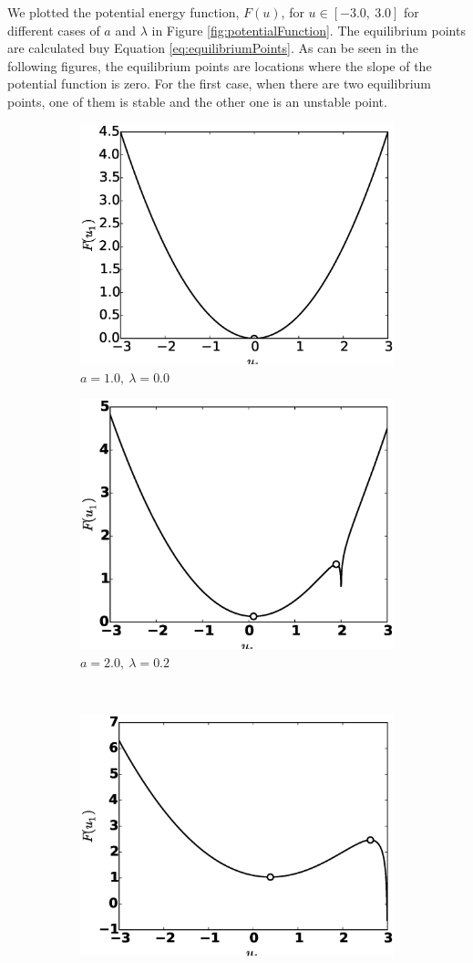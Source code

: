 \documentclass[12pt, a4paper]{extreport}
\begin{document}
%
We plotted the potential energy function, $F(u)$, for $u \in [-3.0,\ 3.0]$ for different cases of $a$ and $\lambda$ in Figure \ref{fig:potentialFunction}. The equilibrium points are calculated buy Equation \eqref{eq:equilibriumPoints}. As can be seen in the following figures, the equilibrium points are locations where the slope of the potential function is zero. For the first case, when there are two equilibrium points, one of them is stable and the other one is an unstable point.
%
\begin{figure}[H]
	\centering
	\begin{subfigure}[h]{8.0 cm}
		\includegraphics[width=8.0 cm]{figure/a10_lambda0.eps}
		\caption{$a=1.0,\ \lambda = 0.0$}
	\end{subfigure}
	\begin{subfigure}[h]{8.0 cm}
        \includegraphics[width=8.0 cm]{figure/a20_lambda2.eps}
		\caption{$a=2.0,\ \lambda = 0.2$}
    \end{subfigure}
    \\
    \begin{subfigure}[h]{8.0 cm}
		\includegraphics[width=8.0 cm]{figure/a30_lambda10.eps}

\end{subfigure}
\end{figure}
\end{document}
